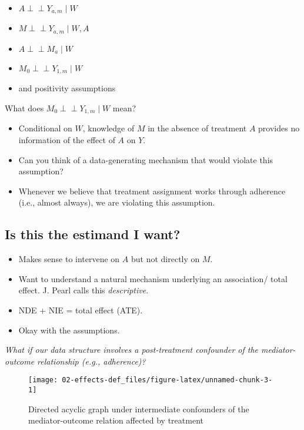 \documentclass[
  12pt,
]{book}
\providecommand{\tightlist}{%
  \setlength{\itemsep}{0pt}\setlength{\parskip}{0pt}}
\theoremstyle{definition}
\theoremstyle{definition}
\theoremstyle{definition}
\newcommand{\indep}{\mbox{$\perp\!\!\!\perp$}}
\newcommand{\1}{\mathbbm{1}}
\begin{document}
\begin{itemize}
\tightlist
\item
  \(A \indep Y_{a,m} \mid W\)
\item
  \(M \indep Y_{a,m} \mid W, A\)
\item
  \(A \indep M_a \mid W\)
\item
  \(M_0 \indep Y_{1,m} \mid W\)
\item
  and positivity assumptions
\end{itemize}

What does \(M_0 \indep Y_{1,m} \mid W\) mean?

\begin{itemize}
\tightlist
\item
  Conditional on \(W\), knowledge of \(M\) in the absence of treatment \(A\)
  provides no information of the effect of \(A\) on \(Y\).
\item
  Can you think of a data-generating mechanism that would violate this
  assumption?
\item
  Whenever we believe that treatment assignment works through adherence (i.e., almost
  always), we are violating this assumption.
\end{itemize}

\hypertarget{is-this-the-estimand-i-want-1}{%
\subsection{Is this the estimand I want?}\label{is-this-the-estimand-i-want-1}}

\begin{itemize}
\tightlist
\item
  Makes sense to intervene on \(A\) but not directly on \(M\).
\item
  Want to understand a natural mechanism underlying an association/ total
  effect. J. Pearl calls this \emph{descriptive}.
\item
  NDE + NIE = total effect (ATE).
\item
  Okay with the assumptions.
\end{itemize}

\emph{What if our data structure involves a post-treatment confounder of the
mediator-outcome relationship (e.g., adherence)?}

\begin{figure}

{\centering \texttt{[image: 02-effects-def\_files/figure-latex/unnamed-chunk-3-1]} 

}

\caption{Directed acyclic graph under intermediate confounders of the mediator-outcome relation affected by treatment}\label{fig:unnamed-chunk-3}
\end{figure}
\end{document}
